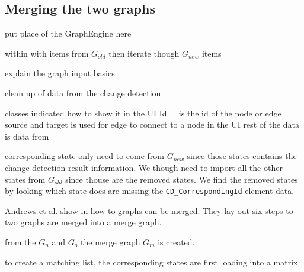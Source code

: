 \subsection{Merging the two graphs} \label{sec:merge-graph}

put place of the GraphEngine here

within with items from $G_{old}$ then iterate though $G_{new}$ items


explain the graph input basics

clean up of data from the change detection


classes indicated how to show it in the UI
Id = is the id of the node or edge
source and target is used for edge to connect to a node in the UI
rest of the data is data from \testar

corresponding state only need to come from $G_{new}$ since those states contains the change detection result information. We though need to import all the other states from $G_{old}$ since thouse are the removed states. We find the removed states by looking which state does are missing the \verb|CD_CorrespondingId| element data. 


Andrews et al. show in \cite{andrews2009visual} how to graphs can be merged. They lay out six steps to two graphs are merged into a merge graph. 


from the $G_n$ and $G_o$ the merge graph $G_m$ is created. 

to create a matching list, the corresponding states are first loading into a matrix 